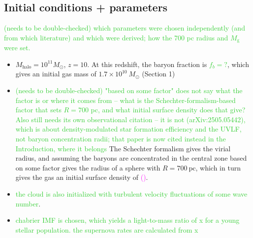 \documentclass[twocolumn,linenumbers]{aastex631}
\begin{document}
\subsection{Initial conditions + parameters}
\textcolor{limegreen}{(needs to be double-checked) which parameters were chosen independently (and from which literature) and which were derived; how the 700 pc radius and $M_\mathrm{g}$ were set.}
\begin{itemize}
    \item $M_\mathrm{halo} = 10^{11} M_\odot$, $z=10$. At this redshift, the baryon fraction is \textcolor{limegreen}{$f_b = ?$}, which gives an initial gas mass of $1.7\times10^{10}\ M_\odot$ (Section 1)
    \item \textcolor{limegreen}{(needs to be double-checked) "based on some factor" does not say what the factor is or where it comes from -- what is the Schechter-formalism-based factor that sets $R=700$ pc, and what initial surface density does that give? Also still needs its own observational citation -- it is not \citet{Somerville2025SFE} (arXiv:2505.05442), which is about density-modulated star formation efficiency and the UVLF, not baryon concentration radii; that paper is now cited instead in the Introduction, where it belongs} The Schechter formalism gives the virial radius, and assuming the baryons are concentrated in the central zone based on some factor gives the radius of a sphere with $R=700\ \mathrm{pc}$, which in turn gives the gas an initial surface density of \textcolor{magenta}{()}.
    \item \textcolor{limegreen}{the cloud is also initialized with turbulent velocity fluctuations of some wave number}.
    \item \textcolor{limegreen}{chabrier IMF is chosen, which yields a light-to-mass ratio of x for a young stellar population. the supernova rates are calculated from x}
    \end{itemize}

\end{document}
